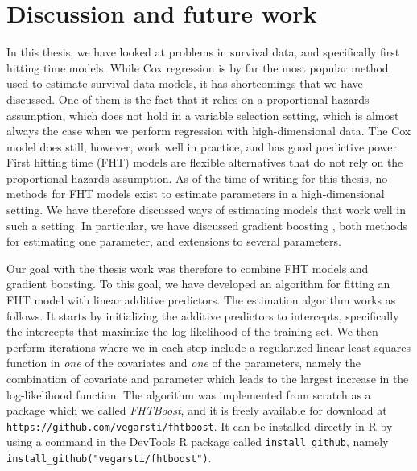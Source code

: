 \chapter{Discussion and future work}
\label{sec:discussion}
In this thesis, we have looked at problems in survival data, and specifically first hitting time models.
While Cox regression is by far the most popular method used to estimate survival data models, it has shortcomings that we have discussed.
One of them is the fact that it relies on a proportional hazards assumption, which does not hold in a variable selection setting, which is almost always the case when we perform regression with high-dimensional data.
The Cox model does still, however, work well in practice, and has good predictive power.
First hitting time (FHT) models are flexible alternatives that do not rely on the proportional hazards assumption.
As of the time of writing for this thesis, no methods for FHT models exist to estimate parameters in a high-dimensional setting.
We have therefore discussed ways of estimating models that work well in such a setting.
In particular, we have discussed gradient boosting \citep{friedman2001}, both methods for estimating one parameter, and extensions to several parameters.

Our goal with the thesis work was therefore to combine FHT models and gradient boosting.
To this goal, we have developed an algorithm for fitting an FHT model with linear additive predictors.
The estimation algorithm works as follows.
It starts by initializing the additive predictors to intercepts, specifically the intercepts that maximize the log-likelihood of the training set.
We then perform iterations where we in each step include a regularized linear least squares function in \textit{one} of the covariates and \textit{one} of the parameters, namely the combination of covariate and parameter which leads to the largest increase in the log-likelihood function.
The algorithm was implemented from scratch as a package which we called \textit{FHTBoost}, and it is freely available for download at \verb|https://github.com/vegarsti/fhtboost|.
It can be installed directly in R by using a command in the DevTools R package \citep{devtools} called \verb|install_github|, namely \verb|install_github("vegarsti/fhtboost")|.


